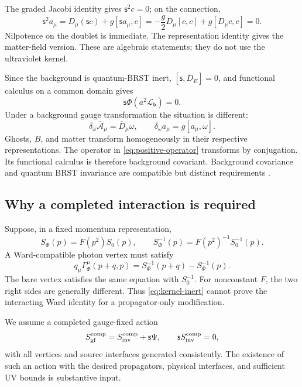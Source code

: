 \documentclass[final,5p,times,twocolumn,numbers,nopreprintline]{elsarticle}
\numberwithin{equation}{section}
\theoremstyle{definition}
\theoremstyle{remark}
\newcommand{\bb}{\mathfrak b}
\newcommand{\BR}{\mathsf s}
\newcommand{\Ph}{\Phi}
\begin{document}
The graded Jacobi identity gives \(\BR^2c=0\); on the connection,
\begin{equation}
 \BR^2a_\mu
 =D_\mu(\BR c)+g[\BR a_\mu,c]
 =-\frac g2D_\mu[c,c]+g[D_\mu c,c]=0 .
 \label{eq:nilpotence}
\end{equation}
Nilpotence on the doublet is immediate. The representation identity
gives the matter-field version. These are algebraic statements;
they do not use the ultraviolet kernel.

Since the background is quantum-BRST inert,
\([\BR,\overline D_E]=0\), and functional calculus on a common
domain gives
\begin{equation}
 \BR\Ph(a^2\mathscr L_{\bb})=0.
 \label{eq:kernel-inert}
\end{equation}
Under a background gauge transformation the situation is different:
\begin{equation}
 \delta_\omega\overline{\mathcal A}_\mu=\overline D_\mu\omega,
 \qquad
 \delta_\omega a_\mu=g[a_\mu,\omega].
 \label{eq:background-transform}
\end{equation}
Ghosts, \(B\), and matter transform homogeneously in their respective
representations. The operator in \eqref{eq:positive-operator}
transforms by conjugation. Its functional calculus is therefore
background covariant. Background covariance and quantum BRST
invariance are compatible but distinct requirements
\cite{Abbott1981,BRST1976,Tyutin1975}.

\subsection{Why a completed interaction is required}
\label{sec:completion-required}

Suppose, in a fixed momentum representation,
\[
 S_\Ph(p)=F(p^2)S_0(p),\qquad
 S_\Ph^{-1}(p)=F(p^2)^{-1}S_0^{-1}(p).
\]
A Ward-compatible photon vertex must satisfy
\begin{equation}
 q_\mu\Gamma_\Ph^\mu(p+q,p)
   =S_\Ph^{-1}(p+q)-S_\Ph^{-1}(p).
 \label{eq:dressed-WTI}
\end{equation}
The bare vertex satisfies the same equation with \(S_0^{-1}\).
For nonconstant \(F\), the two right sides are generally different.
Thus \eqref{eq:kernel-inert} cannot prove the interacting Ward
identity for a propagator-only modification.

We assume a completed gauge-fixed action
\begin{equation}
 S_{\rm gf}^{\rm comp}
   =S_{\rm inv}^{\rm comp}+\BR\Psi,\qquad
 \BR S_{\rm inv}^{\rm comp}=0,
 \label{eq:completed-action}
\end{equation}
with all vertices and source interfaces generated consistently.
The existence of such an action with the desired propagators,
physical interfaces, and sufficient UV bounds is substantive input.
\end{document}

